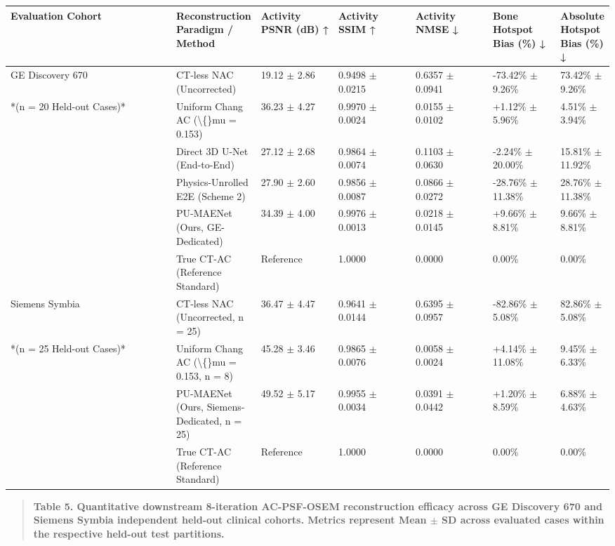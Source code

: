 \documentclass[11pt]{article}
\begin{document}
\begingroup\small\setlength{\tabcolsep}{3pt}\begin{longtable}{p{0.32\linewidth}p{0.14\linewidth}p{0.14\linewidth}p{0.14\linewidth}p{0.14\linewidth}p{0.14\linewidth}p{0.14\linewidth}}
\toprule
Evaluation Cohort & Reconstruction Paradigm / Method & Activity PSNR (dB) ↑ & Activity SSIM ↑ & Activity NMSE ↓ & Bone Hotspot Bias (\%) ↓ & Absolute Hotspot Bias (\%) ↓ \\
\midrule
GE Discovery 670 & CT-less NAC (Uncorrected) & 19.12 $\pm$ 2.86 & 0.9498 $\pm$ 0.0215 & 0.6357 $\pm$ 0.0941 & -73.42\% $\pm$ 9.26\% & 73.42\% $\pm$ 9.26\% \\
*(n = 20 Held-out Cases)* & Uniform Chang AC (\textbackslash\{\}mu = 0.153) & 36.23 $\pm$ 4.27 & 0.9970 $\pm$ 0.0024 & 0.0155 $\pm$ 0.0102 & +1.12\% $\pm$ 5.96\% & 4.51\% $\pm$ 3.94\% \\
 & Direct 3D U-Net (End-to-End) & 27.12 $\pm$ 2.68 & 0.9864 $\pm$ 0.0074 & 0.1103 $\pm$ 0.0630 & -2.24\% $\pm$ 20.00\% & 15.81\% $\pm$ 11.92\% \\
 & Physics-Unrolled E2E (Scheme 2) & 27.90 $\pm$ 2.60 & 0.9856 $\pm$ 0.0087 & 0.0866 $\pm$ 0.0272 & -28.76\% $\pm$ 11.38\% & 28.76\% $\pm$ 11.38\% \\
 & PU-MAENet (Ours, GE-Dedicated) & 34.39 $\pm$ 4.00 & 0.9976 $\pm$ 0.0013 & 0.0218 $\pm$ 0.0145 & +9.66\% $\pm$ 8.81\% & 9.66\% $\pm$ 8.81\% \\
 & True CT-AC (Reference Standard) & Reference & 1.0000 & 0.0000 & 0.00\% & 0.00\% \\
Siemens Symbia & CT-less NAC (Uncorrected, n = 25) & 36.47 $\pm$ 4.47 & 0.9641 $\pm$ 0.0144 & 0.6395 $\pm$ 0.0957 & -82.86\% $\pm$ 5.08\% & 82.86\% $\pm$ 5.08\% \\
*(n = 25 Held-out Cases)* & Uniform Chang AC (\textbackslash\{\}mu = 0.153, n = 8) & 45.28 $\pm$ 3.46 & 0.9865 $\pm$ 0.0076 & 0.0058 $\pm$ 0.0024 & +4.14\% $\pm$ 11.08\% & 9.45\% $\pm$ 6.33\% \\
 & PU-MAENet (Ours, Siemens-Dedicated, n = 25) & 49.52 $\pm$ 5.17 & 0.9955 $\pm$ 0.0034 & 0.0391 $\pm$ 0.0442 & +1.20\% $\pm$ 8.59\% & 6.88\% $\pm$ 4.63\% \\
 & True CT-AC (Reference Standard) & Reference & 1.0000 & 0.0000 & 0.00\% & 0.00\% \\
\bottomrule
\end{longtable}\endgroup
\begin{quote}\small\textbf{Table 5. Quantitative downstream 8-iteration AC-PSF-OSEM reconstruction efficacy across GE Discovery 670 and Siemens Symbia independent held-out clinical cohorts. Metrics represent Mean $\pm$ SD across evaluated cases within the respective held-out test partitions.}\end{quote}
\end{document}
